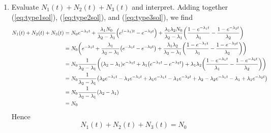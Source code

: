 \documentclass[12pt,a4paper]{article}
\begin{document}
\begin{solution_pset}
\begin{enumerate}[\textbf{(\alph*)}]
\[					  \int_0^t (e^{-\lambda_1 t}-e^{-\lambda_2 t})\dd{t}
				  \]
				  Since
				  \[
					  \int_0^t e^{-\lambda t}\dd{t} 
					  = 
					  \frac{1-e^{-\lambda t}}{\lambda} ,
				  \]
				  Then
				  \[
					  N_3(t) = 
					  \frac{\lambda_1\lambda_2 N_0}{\lambda_2 - \lambda_1}
					  \pqty{
					  \frac{1-e^{-\lambda_1 t}}{\lambda_1} -
					  \frac{1-e^{-\lambda_2 t}}{\lambda_2} 
					  }
				  \]
				  Simplifying, we have
				  \begin{equation}
				  	\label{eq:type3sol}
					\boxed{
					  N_3(t) = 
					  \frac{\lambda_1\lambda_2 N_0}{\lambda_2 - \lambda_1}
					  \pqty{
						  1 - \frac{\lambda_2 e^{-\lambda_1 t} - \lambda_1 e^{-\lambda_2 t}}{\lambda_2 - \lambda_1} 
					  }
					} 
				  \end{equation}
			\item Evaluate $N_1(t) + N_2(t)+ N_3(t)$ and interpret.
				  Adding together (\ref{eq:type1sol}), (\ref{eq:type2sol}), and (\ref{eq:type3sol}), we find
				  {\scriptsize
				  \begin{align*}
					  N_1(t) + N_2(t) + N_3(t) 
					  &=
					  N_0 e^{-\lambda_1 t}
					  +
		     		  \frac{\lambda_1 N_0}{\lambda_2 - \lambda_1}\pqty{
						e^{(- \lambda_1)t} - e^{-\lambda_2 t}
					  } 
					  +
					  \frac{\lambda_1\lambda_2 N_0}{\lambda_2 - \lambda_1}
					  \pqty{
					  \frac{1-e^{-\lambda_1 t}}{\lambda_1} -
					  \frac{1-e^{-\lambda_2 t}}{\lambda_2} 
					  }\\
					  &=
					  N_0 
					  \pqty{
						  e^{-\lambda_1 t}
						  +
						  \frac{\lambda_1 }{\lambda_2 - \lambda_1}\pqty{
							e^{- \lambda_1 t} - e^{-\lambda_2 t}
						  } 
						  +
						  \frac{\lambda_1\lambda_2 }{\lambda_2 - \lambda_1}
						  \pqty{
							  \frac{1-e^{-\lambda_1 t}}{\lambda_1} -
							  \frac{1-e^{-\lambda_2 t}}{\lambda_2} 
						  }
					  }\\
					  &=
					  N_0 \frac{1}{\lambda_2 - \lambda_1}  
					  \pqty{
						  (\lambda_2-\lambda_1)e^{-\lambda_1 t}
						  +
						  \lambda_1 \pqty{
							  e^{-\lambda_1 t} - e^{-\lambda_2 t}
						  }
						  +
						  {\lambda_1\lambda_2 }
						  \pqty{
							  \frac{1-e^{-\lambda_1 t}}{\lambda_1} -
							  \frac{1-e^{-\lambda_2 t}}{\lambda_2} 
						  }
					  }\\
					  &=
					  N_0 \frac{1}{\lambda_2 - \lambda_1}  
					  \pqty{
						  \lambda_2 e^{-\lambda_1 t} -
						  \lambda_1 e^{-\lambda_1 t}
						  +
						  \lambda_1 e^{-\lambda_1 t} -
						  \lambda_1 e^{-\lambda_2 t}
						  +
						  \lambda_2 - \lambda_2 e^{-\lambda_1 t} -
						  \lambda_1 + \lambda_1 e^{-\lambda_2 t}
					  }\\
					  &=
					  N_0 \frac{1}{\lambda_2 - \lambda_1}  
					  \pqty{
						  \lambda_2 - 
						  \lambda_1  
					  }\\
					  &=
					  N_0 
				  \end{align*}
				  }
				  Hence
				  \begin{equation}
				  	\label{eq:constantN}
					\boxed{
					  N_1(t) + N_2(t) + N_3(t) 
					  = N_0
					}
				  \end{equation}


\end{enumerate}
\end{solution_pset}
\end{document}
